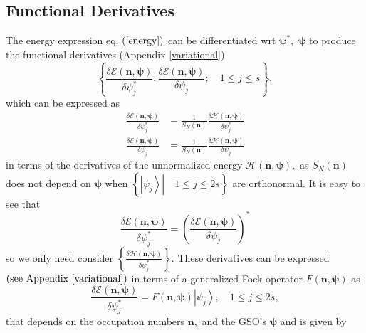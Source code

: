 \documentclass[aps,preprint]{revtex4}%
\begin{document}
\subsection{Functional Derivatives\label{FD}}

The energy expression eq. $\left(  \ref{energy}\right)  $ can be
differentiated wrt $\mathbf{\psi}^{\ast},$ $\mathbf{\psi}$ to produce the
functional derivatives (Appendix \ref{variational})
\begin{equation}
\left\{  \frac{\delta\mathcal{E}\left(  \mathbf{n,\psi}\right)  }{\delta
\psi_{j}^{\ast}},\frac{\delta\mathcal{E}\left(  \mathbf{n,\psi}\right)
}{\delta\psi_{j}};\quad1\leq j\leq s\right\}  ,
\end{equation}
which can be expressed as%
\begin{align}
\frac{\delta\mathcal{E}\left(  \mathbf{n,\psi}\right)  }{\delta\psi_{j}^{\ast
}}  &  =\frac{1}{S_{N}\left(  \mathbf{n}\right)  }\frac{\delta\mathcal{H}%
\left(  \mathbf{n,\psi}\right)  }{\delta\psi_{j}^{\ast}}\\
\frac{\delta\mathcal{E}\left(  \mathbf{n,\psi}\right)  }{\delta\psi_{j}}  &
=\frac{1}{S_{N}\left(  \mathbf{n}\right)  }\frac{\delta\mathcal{H}\left(
\mathbf{n,\psi}\right)  }{\delta\psi_{j}}%
\end{align}
in terms of the derivatives of the unnormalized energy $\mathcal{H}\left(
\mathbf{n,\psi}\right)  ,$ as $S_{N}\left(  \mathbf{n}\right)  $ does not
depend on $\mathbf{\psi}$ when $\left\{  \left.  \left\vert \psi
_{j}\right\rangle \right\vert \quad1\leq j\leq2s\right\}  $ are orthonormal.
It is easy to see that
\begin{equation}
\frac{\delta\mathcal{E}\left(  \mathbf{n,\psi}\right)  }{\delta\psi_{j}^{\ast
}}=\left(  \frac{\delta\mathcal{E}\left(  \mathbf{n,\psi}\right)  }{\delta
\psi_{j}}\right)  ^{\ast}%
\end{equation}
so we only need consider $\left\{  \frac{\delta\mathcal{H}\left(
\mathbf{n,\psi}\right)  }{\delta\psi_{j}^{\ast}}\right\}  .$ These derivatives
can be expressed $\left(  \text{see Appendix \ref{variational}}\right)  $ in
terms of a generalized Fock operator $F\left(  \mathbf{n,\psi}\right)  $ as
\begin{equation}
\frac{\delta\mathcal{E}\left(  \mathbf{n,\psi}\right)  }{\delta\psi_{j}^{\ast
}}=F\left(  \mathbf{n,\psi}\right)  \left\vert \psi_{j}\right\rangle
,\quad1\leq j\leq2s, \label{H_deriv}%
\end{equation}
that depends on the occupation numbers $\mathbf{n,}$ and the GSO's
$\mathbf{\psi}$ and is given by
\end{document}
